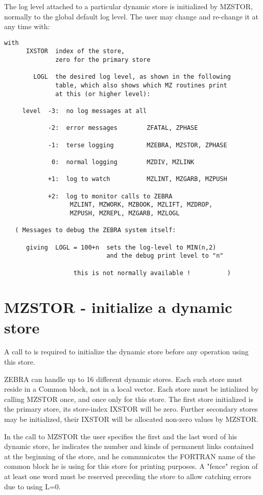 The log level attached to a particular dynamic store is initialized
by MZSTOR, normally to the global default log level.
The user may change and re-change it at any time with:

\begin{verbatim}
with
      IXSTOR  index of the store,
              zero for the primary store

        LOGL  the desired log level, as shown in the following
              table, which also shows which MZ routines print
              at this (or higher level):

     level  -3:  no log messages at all

            -2:  error messages        ZFATAL, ZPHASE

            -1:  terse logging         MZEBRA, MZSTOR, ZPHASE

             0:  normal logging        MZDIV, MZLINK

            +1:  log to watch          MZLINT, MZGARB, MZPUSH

            +2:  log to monitor calls to ZEBRA
                  MZLINT, MZWORK, MZBOOK, MZLIFT, MZDROP,
                  MZPUSH, MZREPL, MZGARB, MZLOGL

   ( Messages to debug the ZEBRA system itself:

      giving  LOGL = 100+n  sets the log-level to MIN(n,2)
                            and the debug print level to "n"

                   this is not normally available !          )
\end{verbatim} 

\section{MZSTOR - initialize a dynamic store}

A call to  is required to initialize the dynamic store
before any operation using this store.

ZEBRA can handle up to 16 different dynamic stores. Each such store
must reside in a Common block, not in a local vector.
Each store must be intialized by calling MZSTOR once,
and once only for this store.
The first store initialized is the primary store,
its store-index IXSTOR will be zero.
Further secondary stores may be initialized,
their IXSTOR will be allocated non-zero values by MZSTOR.

In the call to MZSTOR the user specifies the first and the last
word of his dynamic store, he indicates the number and kinds
of permanent links contained at the beginning of the store,
and he communicates the FORTRAN name of the common block he
is using for this store for printing purposes.
A "fence" region of at least one word must be reserved preceding
the store to allow catching errors due to using L=0.

